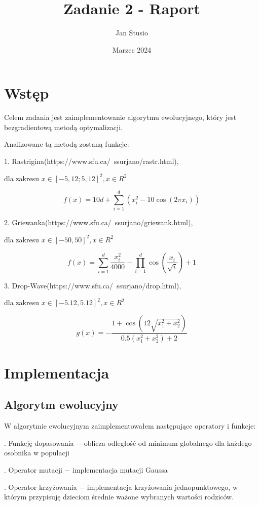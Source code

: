 \documentclass{article}
\title{Zadanie 2 - Raport}
\author{Jan Stusio}
\date{Marzec 2024}
\begin{document}
\maketitle

\section{Wstęp}

Celem zadania jest zaimplementowanie algorytmu ewolucyjnego, który jest bezgradientową metodą optymalizacji.


Analizowane tą metodą zostaną funkcje:

1. Rastrigina(https://www.sfu.ca/~ssurjano/rastr.html),

dla zakresu $x \in [-5,12;5,12]^2, x \in R^2$

$$
f(x) = 10d + \sum_{i=1}^{d} \left( x_i^2 - 10 \cos(2 \pi x_i) \right)
$$

2. Griewanka(https://www.sfu.ca/~ssurjano/griewank.html),

dla zakresu $x \in [-50, 50]^2, x \in R^2$

$$
f(x) =\sum_{i=1}^{d} \frac{x_i^2}{4000} - \prod_{i=1}^{d} \cos\left(\frac{x_i}{\sqrt{i}}\right) +1
$$

3. Drop-Wave(https://www.sfu.ca/~ssurjano/drop.html),

dla zakresu $x \in [-5.12, 5.12]^2, x \in R^2$

$$
g(x) = -\frac{1 + \cos\left(12 \sqrt{x_1^2 + x_2^2}\right)}{0.5(x_1^2 + x_2^2) + 2}
$$

\pagebreak

\section{Implementacja}

\subsection{Algorytm ewolucyjny}

W algorytmie ewolucyjnym zaimplementowałem następujące operatory i funkcje:

. Funkcję dopasowania $-$ oblicza odległość od minimum globalnego dla każdego osobnika w populacji

. Operator mutacji $-$ implementacja mutacji Gaussa

. Operator krzyżowania $-$ implementacja krzyżowania jednopunktowego, w którym przypisuję dzieciom średnie ważone wybranych wartości rodziców.
\end{document}
